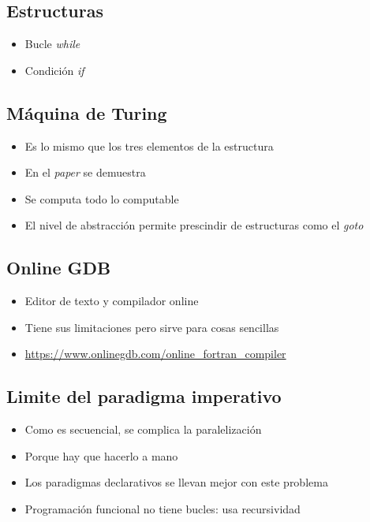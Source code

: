 \subsection{Estructuras}
\begin{itemize}
    \item Bucle \textit{while}
    \item Condición \textit{if}
\end{itemize}

\subsection{Máquina de Turing}
\begin{itemize}
    \item Es lo mismo que los tres elementos de la estructura 
    \item En el \textit{paper} se demuestra
    \item Se computa todo lo computable
    \item El nivel de abstracción permite prescindir de estructuras como el \textit{goto}
\end{itemize}

\subsection{Online GDB}
\begin{itemize}
    \item Editor de texto y compilador online
    \item Tiene sus limitaciones pero sirve para cosas sencillas
    \item \url{https://www.onlinegdb.com/online_fortran_compiler}
\end{itemize}

\subsection{Limite del paradigma imperativo}
\begin{itemize}
    \item Como es secuencial, se complica la paralelización 
    \item Porque hay que hacerlo a mano 
    \item Los paradigmas declarativos se llevan mejor con este problema
    \item Programación funcional no tiene bucles: usa recursividad
\end{itemize}

